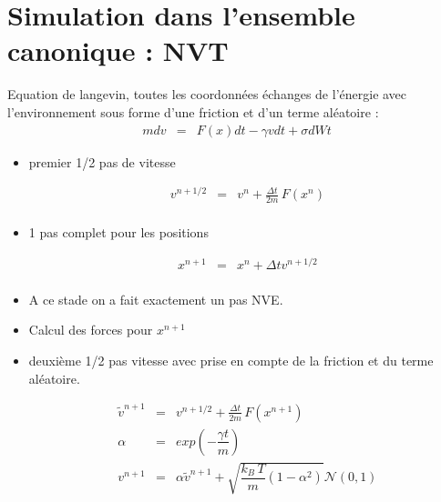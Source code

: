 \documentclass[11pt,a4paper,fleqn]{book}
\begin{document}

\section{Simulation dans l'ensemble canonique : NVT}

Equation de langevin, toutes les coordonnées échanges de l'énergie avec
l'environnement sous forme d'une friction et d'un terme aléatoire :
%
\begin{eqnarray}
	m dv & = & F(x) dt - \gamma v dt + \sigma dWt \label{eq_langevin}
\end{eqnarray}
%
\begin{itemize}
	\item premier 1/2 pas de vitesse

	\begin{eqnarray*}
		v^{n+1/2} & = & v^n + \frac{\Delta t}{2m} \, F(x^n) \\
	\end{eqnarray*}

	\item 1 pas complet pour les positions

	\begin{eqnarray*}
		x^{n+1} & = & x^n + \Delta t v^{n+1/2} \\
	\end{eqnarray*}

	\item A ce stade on a fait exactement un pas NVE. \\

	\item Calcul des forces pour $x^{n+1}$ \\

	\item deuxième 1/2 pas vitesse avec prise en compte de la friction
	et du terme aléatoire.

	\begin{eqnarray*}
		\tilde v^{n+1} & = &  v^{n+1/2} + \frac{\Delta t}{2m} \, F(x^{n+1}) \\
		\alpha & = & exp\left(-\dfrac{\gamma t}{m}\right) \\
		v^{n+1} & = & \alpha \tilde v^{n+1} + 
			\sqrt{\dfrac{k_B\,T}{m}(1-\alpha^2)} \mathcal{N}(0,1) \\
	\end{eqnarray*}
\end{itemize}
\end{document}
